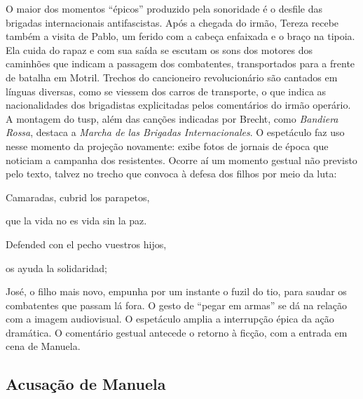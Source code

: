 O maior dos momentos “épicos” produzido pela sonoridade é o desfile das
brigadas internacionais antifascistas. Após a chegada do irmão, Tereza
recebe também a visita de Pablo, um ferido com a cabeça enfaixada e o
braço na tipoia. Ela cuida do rapaz e com sua saída se escutam os sons
dos motores dos caminhões que indicam a passagem dos combatentes,
transportados para a frente de batalha em Motril. Trechos do cancioneiro
revolucionário são cantados em línguas diversas, como se viessem dos
carros de transporte, o que indica as nacionalidades dos brigadistas
explicitadas pelos comentários do irmão operário. A montagem do {\sc tusp},
além das canções indicadas por Brecht, como {\it Bandiera Rossa},
destaca a {\it Marcha de las Brigadas Internacionales}. O espetáculo faz
uso nesse momento da projeção novamente: exibe fotos de jornais de época
que noticiam a campanha dos resistentes. Ocorre aí um momento gestual
não previsto pelo texto, talvez no trecho que convoca à defesa dos
filhos por meio da luta:

\startblockquote
Camaradas, cubrid los parapetos,

que la vida no es vida sin la paz.

Defended con el pecho vuestros hijos,

os ayuda la solidaridad;
\stopblockquote


José, o filho mais novo, empunha por um instante o fuzil do tio, para
saudar os combatentes que passam lá fora. O gesto de “pegar em armas” se
dá na relação com a imagem audiovisual. O espetáculo amplia a
interrupção épica da ação dramática. O comentário gestual antecede o
retorno à ficção, com a entrada em cena de Manuela.




\page

\subsection{Acusação de Manuela}

